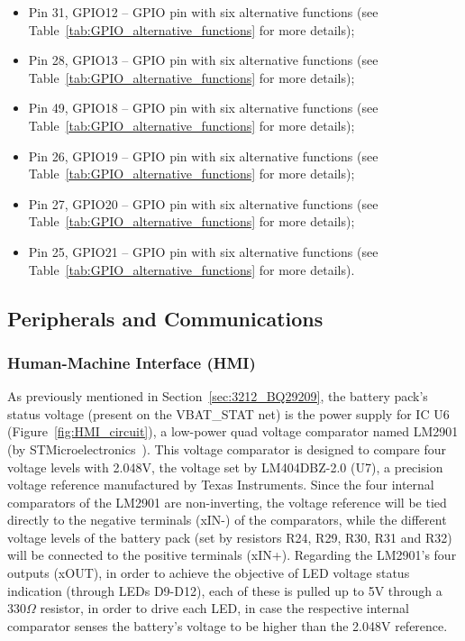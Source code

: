 \begin{itemize}
	\item Pin 31, GPIO12 -- GPIO pin with six alternative functions (see Table~\ref{tab:GPIO_alternative_functions} for more details);

	\item Pin 28, GPIO13 -- GPIO pin with six alternative functions (see Table~\ref{tab:GPIO_alternative_functions} for more details);

	\item Pin 49, GPIO18 -- GPIO pin with six alternative functions (see Table~\ref{tab:GPIO_alternative_functions} for more details);

	\item Pin 26, GPIO19 -- GPIO pin with six alternative functions (see Table~\ref{tab:GPIO_alternative_functions} for more details);

	\item Pin 27, GPIO20 -- GPIO pin with six alternative functions (see Table~\ref{tab:GPIO_alternative_functions} for more details);

	\item Pin 25, GPIO21 -- GPIO pin with six alternative functions (see Table~\ref{tab:GPIO_alternative_functions} for more details).
\end{itemize}


\subsection{Peripherals and Communications}\label{sec:323_PERIPHERALS_COMMS}


\subsubsection{Human-Machine Interface (HMI)}\label{sec:3231_BACKPANEL}

As previously mentioned in Section~\ref{sec:3212_BQ29209}, the battery pack's status voltage (present on the VBAT\_STAT net) is the power supply for IC U6 (Figure~\ref{fig:HMI_circuit}), a low-power quad voltage comparator named LM2901 (by STMicroelectronics~\cite{LM2901}). This voltage comparator is designed to compare four voltage levels with 2.048V, the voltage set by LM404DBZ-2.0 (U7), a precision voltage reference manufactured by Texas Instruments. Since the four internal comparators of the LM2901 are non-inverting, the voltage reference will be tied directly to the negative terminals (xIN-) of the comparators, while the different voltage levels of the battery pack (set by resistors R24, R29, R30, R31 and R32) will be connected to the positive terminals (xIN+). Regarding the LM2901's four outputs (xOUT), in order to achieve the objective of LED voltage status indication (through LEDs D9-D12), each of these is pulled up to 5V through a 330$\Omega$ resistor, in order to drive each LED, in case the respective internal comparator senses the battery's voltage to be higher than the 2.048V reference.

